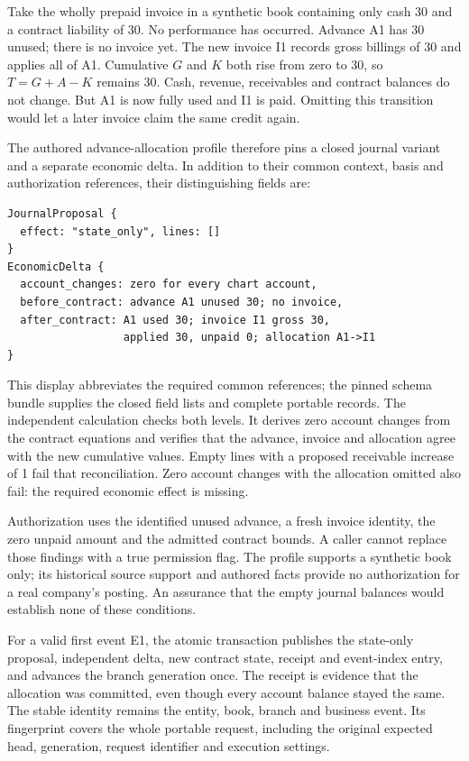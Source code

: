 Take the wholly prepaid invoice in a synthetic book containing only cash 30
and a contract liability of 30. No performance has occurred. Advance A1 has
30 unused; there is no invoice yet. The new invoice I1 records gross billings
of 30 and applies all of A1. Cumulative $G$ and $K$ both rise from zero to 30,
so $T=G+A-K$ remains 30. Cash, revenue, receivables and contract balances do
not change. But A1 is now fully used and I1 is paid. Omitting this transition
would let a later invoice claim the same credit again.

The authored advance-allocation profile therefore pins a closed journal
variant and a separate economic delta. In addition to their common context,
basis and authorization references, their distinguishing fields are:
\begin{lstlisting}
JournalProposal {
  effect: "state_only", lines: []
}
EconomicDelta {
  account_changes: zero for every chart account,
  before_contract: advance A1 unused 30; no invoice,
  after_contract: A1 used 30; invoice I1 gross 30,
                  applied 30, unpaid 0; allocation A1->I1
}
\end{lstlisting}
This display abbreviates the required common references; the pinned schema
bundle supplies the closed field lists and complete portable records. The
independent calculation checks both levels. It derives zero account changes
from the contract equations and verifies that the advance, invoice and
allocation agree with the new cumulative values. Empty lines with a proposed
receivable increase of 1 fail that reconciliation. Zero account changes with
the allocation omitted also fail: the required economic effect is missing.

Authorization uses the identified unused advance, a fresh invoice identity,
the zero unpaid amount and the admitted contract bounds. A caller cannot
replace those findings with a true permission flag. The profile supports a
synthetic book only; its historical source support and authored facts provide
no authorization for a real company's posting. An assurance that the empty
journal balances would establish none of these conditions.

For a valid first event E1, the atomic transaction publishes the state-only
proposal, independent delta, new contract state, receipt and event-index entry,
and advances the branch generation once. The receipt is evidence that the
allocation was committed, even though every account balance stayed the same.
The stable identity remains the entity, book, branch and business event.
Its fingerprint covers the whole portable request, including the original
expected head, generation, request identifier and execution settings.

